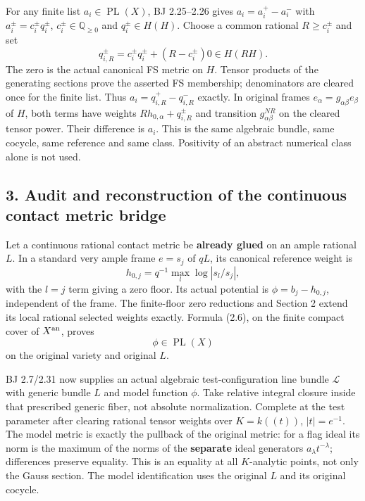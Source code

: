\documentclass[
  10pt,
]{article}
\begin{document}
For any finite list \(a_i\in\operatorname{PL}(X)\), BJ 2.25--2.26 gives
\(a_i=a_i^+-a_i^-\) with \(a_i^\pm=c_i^\pm q_i^\pm\),
\(c_i^\pm\in\mathbb Q_{\ge0}\) and \(q_i^\pm\in H(H)\). Choose a common
rational \(R\ge c_i^\pm\) and set
\[q_{i,R}^\pm=c_i^\pm q_i^\pm+(R-c_i^\pm)0\in H(RH). \tag{2.9}\] The
zero is the actual canonical FS metric on \(H\). Tensor products of the
generating sections prove the asserted FS membership; denominators are
cleared once for the finite list. Thus \(a_i=q_{i,R}^+-q_{i,R}^-\)
exactly. In original frames \(e_\alpha=g_{\alpha\beta}e_\beta\) of
\(H\), both terms have weights \(Rh_{0,\alpha}+q_{i,R}^\pm\) and
transition \(g_{\alpha\beta}^{NR}\) on the cleared tensor power. Their
difference is \(a_i\). This is the same algebraic bundle, same cocycle,
same reference and same class. Positivity of an abstract numerical class
alone is not used.

\subsection{3. Audit and reconstruction of the continuous contact metric
bridge}\label{audit-and-reconstruction-of-the-continuous-contact-metric-bridge}

Let a continuous rational contact metric be \textbf{already glued} on an
ample rational \(L\). In a standard very ample frame \(e=s_j\) of
\(qL\), its canonical reference weight is
\[h_{0,j}=q^{-1}\max_l\log|s_l/s_j|,\] with the \(l=j\) term giving a
zero floor. Its actual potential is \(\phi=b_j-h_{0,j}\), independent of
the frame. The finite-floor zero reductions and Section 2 extend its
local rational selected weights exactly. Formula (2.6), on the finite
compact cover of \(X^{\rm an}\), proves \[\phi\in\operatorname{PL}(X)\]
on the original variety and original \(L\).

BJ 2.7/2.31 now supplies an actual algebraic test-configuration line
bundle \(\mathcal L\) with generic bundle \(L\) and model function
\(\phi\). Take relative integral closure inside that prescribed generic
fiber, not absolute normalization. Complete at the test parameter after
clearing rational tensor weights over \(K=k((t))\), \(|t|=e^{-1}\). The
model metric is exactly the pullback of the original metric: for a flag
ideal its norm is the maximum of the norms of the \textbf{separate}
ideal generators \(a_\lambda t^{-\lambda}\); differences preserve
equality. This is an equality at all \(K\)-analytic points, not only the
Gauss section. The model identification uses the original \(L\) and its
original cocycle.
\end{document}
